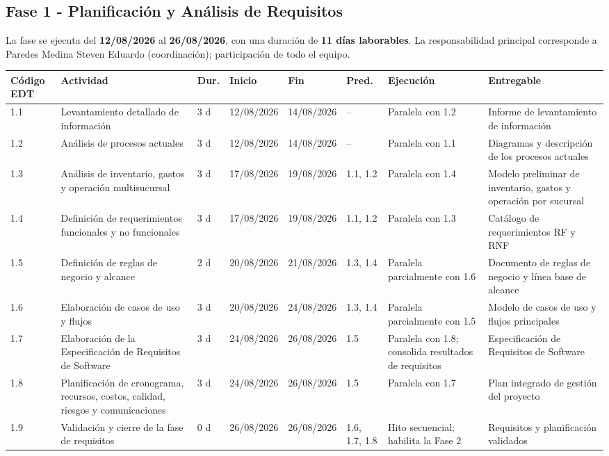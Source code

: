 \documentclass[12pt,a4paper]{article}
\begin{document}
\begin{landscape}
\subsection{Fase 1 - Planificación y Análisis de Requisitos}

La fase se ejecuta del \textbf{12/08/2026} al \textbf{26/08/2026}, con una duración de \textbf{11 días laborables}. 
La responsabilidad principal corresponde a Paredes Medina Steven Eduardo (coordinación); participación de todo el equipo.

\begin{center}
\setlength{\tabcolsep}{3pt}
\renewcommand{\arraystretch}{1.15}
\fontsize{7.2}{8.5}\selectfont
\begin{tabularx}{\linewidth}{|p{0.85cm}|p{4.0cm}|p{0.75cm}|p{1.45cm}|p{1.45cm}|p{1.4cm}|p{4.0cm}|X|}
\hline
\rowcolor{tableheader}
\textbf{Código EDT} & \textbf{Actividad} & \textbf{Dur.} & \textbf{Inicio} & \textbf{Fin} & \textbf{Pred.} & \textbf{Ejecución} & \textbf{Entregable} \\ \hline
1.1 & Levantamiento detallado de información & 3 d & 12/08/2026 & 14/08/2026 & -- & Paralela con 1.2 & Informe de levantamiento de información \\ \hline
1.2 & Análisis de procesos actuales & 3 d & 12/08/2026 & 14/08/2026 & -- & Paralela con 1.1 & Diagramas y descripción de los procesos actuales \\ \hline
1.3 & Análisis de inventario, gastos y operación multisucursal & 3 d & 17/08/2026 & 19/08/2026 & 1.1, 1.2 & Paralela con 1.4 & Modelo preliminar de inventario, gastos y operación por sucursal \\ \hline
1.4 & Definición de requerimientos funcionales y no funcionales & 3 d & 17/08/2026 & 19/08/2026 & 1.1, 1.2 & Paralela con 1.3 & Catálogo de requerimientos RF y RNF \\ \hline
1.5 & Definición de reglas de negocio y alcance & 2 d & 20/08/2026 & 21/08/2026 & 1.3, 1.4 & Paralela parcialmente con 1.6 & Documento de reglas de negocio y línea base de alcance \\ \hline
1.6 & Elaboración de casos de uso y flujos & 3 d & 20/08/2026 & 24/08/2026 & 1.3, 1.4 & Paralela parcialmente con 1.5 & Modelo de casos de uso y flujos principales \\ \hline
1.7 & Elaboración de la Especificación de Requisitos de Software & 3 d & 24/08/2026 & 26/08/2026 & 1.5 & Paralela con 1.8; consolida resultados de requisitos & Especificación de Requisitos de Software \\ \hline
1.8 & Planificación de cronograma, recursos, costos, calidad, riesgos y comunicaciones & 3 d & 24/08/2026 & 26/08/2026 & 1.5 & Paralela con 1.7 & Plan integrado de gestión del proyecto \\ \hline
1.9 & Validación y cierre de la fase de requisitos & 0 d & 26/08/2026 & 26/08/2026 & 1.6, 1.7, 1.8 & Hito secuencial; habilita la Fase 2 & Requisitos y planificación validados \\ \hline
\end{tabularx}
\end{center}
\end{landscape}
\end{document}
